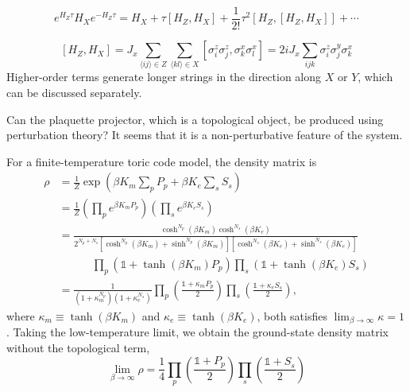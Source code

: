 \documentclass[12font]{article}
\numberwithin{equation}{section}    %
\theoremstyle{definition}
\newcommand{\anglelr}[1]{\langle #1 \rangle}
\newcommand{\lr}[1]{\left(  #1  \right)}
\newcommand{\lrm}[1]{\left[  #1  \right]}
\newcommand{\alert}[1]{{\color{red}#1}}
\begin{document}
\[
e^{H_Z\tau} H_X e^{-H_Z\tau} = H_X + \tau [H_Z,H_X] + \frac{1}{2!}\tau^2 [H_Z,[H_Z,H_X]] + \cdots
\]

\[
[H_Z,H_X] 
= J_x\sum_{\anglelr{ij}\in Z} \sum_{\anglelr{kl}\in X}[\sigma^z_i\sigma^z_j, \sigma^x_k\sigma^x_l]
=
2iJ_x\sum_{ijk}\sigma^z_i\sigma^y_j\sigma^x_k
\]
Higher-order terms generate longer strings in the direction along $X$ or $Y$, which can be discussed separately. 

\alert{Can the plaquette projector, which is a topological object, be produced using perturbation theory? It seems that it is a non-perturbative feature of the system.}

For a finite-temperature toric code model, the density matrix is~\cite{Iblisdir-Perez-Garcia-Aguado-Pachos_2009, Iblisdir-Perez-Garcia-Aguado-Pachos_2010, Nussinov-Ortiz_2009}
\begin{align}\label{eq:TC-DM-finite-T}
\rho 
&= \frac{1}{Z}\exp\lr{\beta K_m\sum_{p}P_p + \beta K_e\sum_{s}S_s} \nonumber \\
&= 
\frac{1}{Z}
\lr{\prod_p e^{\beta K_m P_p}}
\lr{\prod_s e^{\beta K_e S_s}} \nonumber \\
&=
\frac{
\cosh^{N_p}(\beta K_m)
\cosh^{N_s}(\beta K_e)
}
{
2^{N_p + N_s}
\lrm{\cosh^{N_p}(\beta K_m) + \sinh^{N_p}(\beta K_m)} 
\lrm{\cosh^{N_s}(\beta K_e) + \sinh^{N_s}(\beta K_e)} 
} \nonumber \\
&\quad\quad\quad \prod_p\lr{\mathds{1} + \tanh(\beta K_m)P_p}
\prod_s\lr{\mathds{1} + \tanh(\beta K_e)S_s} \nonumber \\
&= 
\frac{1}
{
\lr{1 + \kappa_m^{N_p}} 
\lr{1 + \kappa_e^{N_s}} 
}
\prod_p
\lr{
\frac{\mathds{1} + \kappa_m P_p}{2}
}
\prod_s
\lr{
\frac{\mathds{1} + \kappa_e S_s}{2}
},
\end{align}
where $\kappa_m \equiv \tanh(\beta K_m)$ and $\kappa_e \equiv \tanh(\beta K_e)$, both satisfies $\lim_{\beta\to \infty} \kappa = 1$. Taking the low-temperature limit, we obtain the ground-state density matrix without the topological term,
\begin{equation}
    \lim_{\beta\to\infty}\rho = 
    \frac{1}{4}\prod_p\lr{\frac{\mathds{1} + P_p}{2}}
\prod_s\lr{\frac{\mathds{1} + S_s}{2}}
\end{equation}
\end{document}
